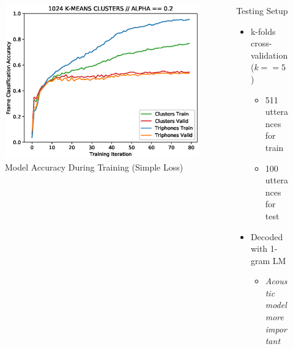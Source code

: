 \documentclass[final]{beamer} %
\newlength{\columnheight}
\begin{document}
\begin{frame}
\begin{columns}
\begin{column}{0.3\textwidth}
{        \vfill

        \begin{figure}[!htbp]
          \centering
          \minipage{\textwidth}
          \centering
          \includegraphics[width=.8\linewidth]{figs/1_point_2_1024.eps}
          \caption{Model Accuracy During Training (Simple Loss)}
          \endminipage\hfill
        \end{figure}

        

        
      } %
    \end{column}

    
    \begin{column}{0.3\textwidth}
      \parbox[t][\columnheight]{.9\textwidth}{
        \vspace{1cm}               %

        
        \begin{block}{\boxnumber Testing Setup}
          \begin{itemize}
          \item k-folds cross-validation ($k==5$)
            \begin{itemize}
            \item 511 utterances for train
            \item 100 utterances for test
            \end{itemize}
          \item Decoded with 1-gram LM
            \begin{itemize}
            \item \textit{Acoustic model more important}
            \end{itemize}
          \end{itemize}
        \end{block}

}
\end{column}
\end{columns}
\end{frame}
\end{document}
